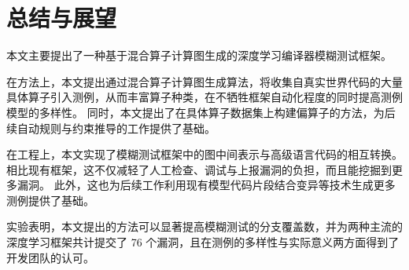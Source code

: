 
\chapter{总结与展望}
\label{chp:sum}

本文主要提出了一种基于混合算子计算图生成的深度学习编译器模糊测试框架。

在方法上，本文提出通过混合算子计算图生成算法，将收集自真实世界代码的大量具体算子引入测例，从而丰富算子种类，在不牺牲框架自动化程度的同时提高测例模型的多样性。
同时，本文提出了在具体算子数据集上构建偏算子的方法，为后续自动规则与约束推导的工作提供了基础。

在工程上，本文实现了模糊测试框架中的图中间表示与高级语言代码的相互转换。
相比现有框架，这不仅减轻了人工检查、调试与上报漏洞的负担，而且能挖掘到更多漏洞。
此外，这也为后续工作利用现有模型代码片段结合变异等技术生成更多测例提供了基础。

实验表明，本文提出的方法可以显著提高模糊测试的分支覆盖数，并为两种主流的深度学习框架共计提交了 76 个漏洞，且在测例的多样性与实际意义两方面得到了开发团队的认可。
